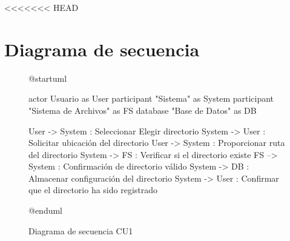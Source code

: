 <<<<<<< HEAD

\section*{Diagrama de secuencia}

\begin{figure}[H]
	\centering
  \begin{plantuml}
    @startuml

    actor Usuario as User
    participant "Sistema" as System
    participant "Sistema de Archivos" as FS
    database "Base de Datos" as DB
    
    User -> System : Seleccionar Elegir directorio
    System -> User : Solicitar ubicación del directorio
    User -> System : Proporcionar ruta del directorio
    System -> FS : Verificar si el directorio existe
    FS --> System : Confirmación de directorio válido
    System -> DB : Almacenar configuración del directorio
    System -> User : Confirmar que el directorio ha sido registrado
    
    @enduml
  \end{plantuml}
	\caption{Diagrama de secuencia CU1}
\end{figure}

